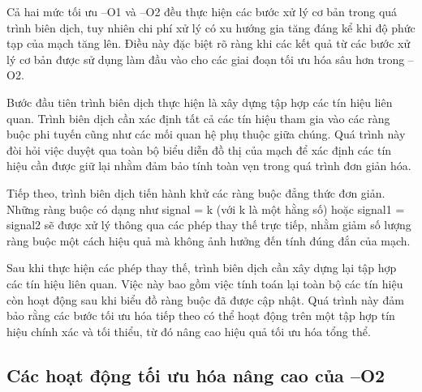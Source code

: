     

Cả hai mức tối ưu –O1 và –O2 đều thực hiện các bước xử lý cơ bản trong quá trình biên dịch, tuy nhiên chi phí xử lý có xu hướng gia tăng đáng kể khi độ phức tạp của mạch tăng lên. Điều này đặc biệt rõ ràng khi các kết quả từ các bước xử lý cơ bản được sử dụng làm đầu vào cho các giai đoạn tối ưu hóa sâu hơn trong –O2.

Bước đầu tiên trình biên dịch thực hiện là xây dựng tập hợp các tín hiệu liên quan. Trình biên dịch cần xác định tất cả các tín hiệu tham gia vào các ràng buộc phi tuyến cũng như các mối quan hệ phụ thuộc giữa chúng. Quá trình này đòi hỏi việc duyệt qua toàn bộ biểu diễn đồ thị của mạch để xác định các tín hiệu cần được giữ lại nhằm đảm bảo tính toàn vẹn trong quá trình đơn giản hóa.

Tiếp theo, trình biên dịch tiến hành khử các ràng buộc đẳng thức đơn giản. Những ràng buộc có dạng như signal = k (với k là một hằng số) hoặc signal1 = signal2 sẽ được xử lý thông qua các phép thay thế trực tiếp, nhằm giảm số lượng ràng buộc một cách hiệu quả mà không ảnh hưởng đến tính đúng đắn của mạch.

Sau khi thực hiện các phép thay thế, trình biên dịch cần xây dựng lại tập hợp các tín hiệu liên quan. Việc này bao gồm việc tính toán lại toàn bộ các tín hiệu còn hoạt động sau khi biểu đồ ràng buộc đã được cập nhật. Quá trình này đảm bảo rằng các bước tối ưu hóa tiếp theo có thể hoạt động trên một tập hợp tín hiệu chính xác và tối thiểu, từ đó nâng cao hiệu quả tối ưu hóa tổng thể.

\subsection{Các hoạt động tối ưu hóa nâng cao của --O2}

